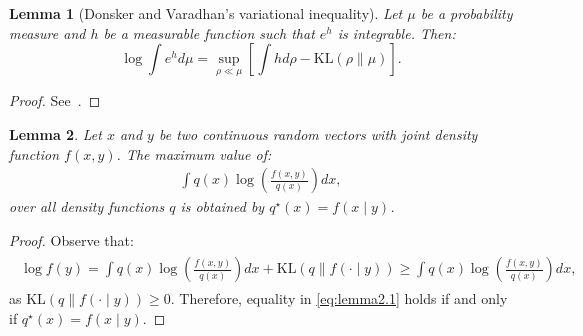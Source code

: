 \documentclass[12pt]{article}
\newtheorem{lemma}{Lemma}[section]
\numberwithin{equation}{section}
\begin{document}
\begin{lemma}[Donsker and Varadhan's variational inequality]\label{lemma-variational-inequality}
Let $\mu$ be a probability measure and $h$ be a measurable function such that $e^{h}$ is integrable. Then:
\begin{equation}
    \log\int e^{h}d\mu = \sup_{\rho\ll\mu}\left[\int h d\rho - \mathrm{KL}(\rho\parallel \mu)\right].
\end{equation}
\end{lemma}

\begin{proof}
See~\cite{DonskerVaradhan1983IV}.
\end{proof}

\begin{lemma}
\label{lemma-auxiliary}
Let $x$ and $y$ be two continuous random vectors with joint density function $f(x, y)$. The maximum value of:
\begin{align}
    \int q(x)\log\left(\frac{f(x,y)}{q(x)}\right)dx,
\end{align}
over all density functions $q$ is obtained by $q^{\star}(x) = f(x\mid y)$.
\end{lemma}

\begin{proof}
Observe that:
\begin{align}\label{eq:lemma2.1}
    \begin{split}
        \log f(y) = \int q(x)\log \left(\frac{f(x, y)}{q(x)}\right)dx + \mathrm{KL}(q\parallel f(\cdot\mid y)) \geq \int q(x)\log \left(\frac{f(x, y)}{q(x)}\right)dx,
    \end{split}
\end{align}
as $\mathrm{KL}(q\parallel f(\cdot\mid y))\geq 0$. Therefore, equality in \eqref{eq:lemma2.1} holds if and only if $q^{\star}(x) = f(x\mid y)$.
\end{proof}
\end{document}
